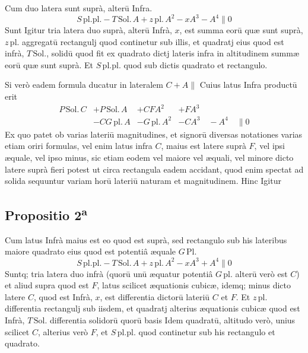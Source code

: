 \documentclass[11pt,a4paper]{article}
\begin{document}
Cum duo latera sunt suprà, alterū Infra.
\[ S\,\mathrm{pl.pl.} - T\,\mathrm{Sol.}\,A + z\,\mathrm{pl.}\,A^{2} - xA^{3} - A^{4} \parallel 0 \]
Sunt Igitur tria latera duo suprà, alterū Infrà, $x$, est summa eorū quæ sunt suprà, $z\,\mathrm{pl.}$ aggregatū rectangulj quod continetur sub illis, et quadratj eius quod est infrà, $T\,\mathrm{Sol.}$, solidū quod fit ex quadrato dictj lateris infra in altitudinem summæ eorū quæ sunt suprà. Et $S\,\mathrm{pl.pl.}$ quod sub dictis quadrato et rectangulo.

Si verò eadem formula ducatur in lateralem $C + A \parallel$ Cuius latus Infra productū erit
\[ \begin{array}{llll} P\,\mathrm{Sol.}\,C & + P\,\mathrm{Sol.}\,A & + CFA^{2} & + FA^{3} \\ & - CG\,\mathrm{pl.}\,A & - G\,\mathrm{pl.}\,A^{2} & - CA^{3} \quad - A^{4} \quad \parallel 0 \end{array} \]
Ex quo patet ob varias lateriū magnitudines, et signorū diversas notationes varias etiam oriri formulas, vel enim latus infra $C$, maius est latere suprà $F$, vel ipsi æquale, vel ipso minus, sic etiam eodem vel maiore vel æquali, vel minore dicto latere suprà fieri potest ut circa rectangula eadem accidant, quod enim spectat ad solida sequuntur variam horū lateriū naturam et magnitudinem. Hinc Igitur

\subsection*{Propositio 2\textsuperscript{a}}

Cum latus Infrà maius est eo quod est suprà, sed rectangulo sub his lateribus maiore quadrato eius quod est potentiâ æquale $G\,\mathrm{Pl.}$
\[ S\,\mathrm{pl.pl.} - T\,\mathrm{Sol.}\,A + z\,\mathrm{pl.}\,A^{2} - xA^{3} + A^{4} \parallel 0 \]
Suntq; tria latera duo infrà (quorū unū æquatur potentiâ $G\,\mathrm{pl.}$ alterū verò est $C$) et aliud supra quod est $F$, latus scilicet æquationis cubicæ, idemq; minus dicto latere $C$, quod est Infrà, $x$, est differentia dictorū lateriū $C$ et $F$. Et $z\,\mathrm{pl.}$ differentia rectangulj sub iisdem, et quadratj alterius æquationis cubicæ quod est Infrà, $T\,\mathrm{Sol.}$ differentia solidorū quorū basis Idem quadratū, altitudo verò, unius scilicet $C$, alterius verò $F$, et $S\,\mathrm{pl.pl.}$ quod continetur sub his rectangulo et quadrato.
\end{document}

